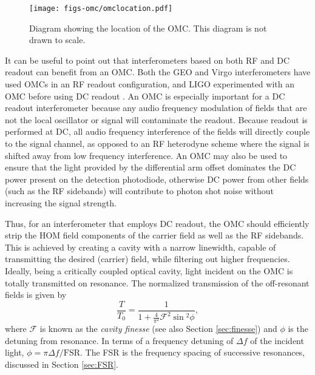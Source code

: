 \begin{figure}
  \begin{center}
  \leavevmode
  \texttt{[image: figs-omc/omclocation.pdf]}
  \end{center}
  \caption[Diagram showing the location of the OMC.]{Diagram showing the location of the OMC. This diagram is not drawn to scale.}
  \label{fig:omclocation}
\end{figure}

It can be useful to point out that interferometers based on both RF and DC readout can benefit from an OMC. %
Both the GEO and Virgo interferometers have used OMCs in an RF readout configuration, and LIGO experimented with an OMC before using DC readout \cite{G040326}. %
An OMC is especially important for a DC readout interferometer because any audio frequency modulation of fields that are not the local oscillator or signal will contaminate the readout. %
Because readout is performed at DC, all audio frequency interference of the fields will directly couple to the signal channel, as opposed to an RF heterodyne scheme where the signal is shifted away from low frequency interference. %
An OMC may also be used to ensure that the light provided by the differential arm offset dominates the DC power present on the detection photodiode, otherwise DC power from other fields (such as the RF sidebands) will contribute to photon shot noise without increasing the signal strength. %


Thus, for an interferometer that employs DC readout, the OMC should efficiently strip the HOM field components of the carrier field as well as the RF sidebands. %
This is achieved by creating a cavity with a narrow linewidth, capable of transmitting the desired (carrier) field, while filtering out higher frequencies. %
Ideally, being a critically coupled optical cavity, light incident on the OMC is totally transmitted on resonance. %
The normalized transmission of the off-resonant fields is given by
\begin{equation}
\label{eqn:finesse}
\frac{T}{T_0}=\frac{1}{1+\frac{4}{\pi^2}\mathcal{F}^2\sin{}^2\phi},
\end{equation}
where $\mathcal{F}$ is known as the \emph{cavity finesse} (see also Section \ref{sec:finesse}) and $\phi$ is the detuning from resonance. %
In terms of a frequency detuning of $\Delta f$ of the incident light, $\phi = \pi \Delta f / \mathrm{FSR}$. %
The FSR is the frequency spacing of successive resonances, discussed in Section \ref{sec:FSR}.

